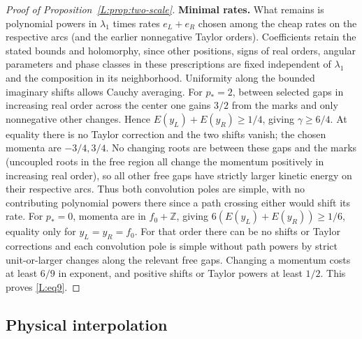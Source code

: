 \documentclass[11pt]{article}
\numberwithin{equation}{section}
\theoremstyle{definition}\newtheorem{definition}[theorem]{Definition}
\theoremstyle{remark}\newtheorem{remark}[theorem]{Remark}
\begin{document}
\begin{proof}[Proof of Proposition~\ref{L:prop:two-scale}]
\par  \textbf{Minimal rates.}
What remains is polynomial powers in \(\lambda_1\) times rates \(e_L+e_R\) chosen among the cheap rates on the respective arcs (and the earlier nonnegative Taylor orders). Coefficients retain the stated bounds and holomorphy, since other positions, signs of real orders, angular parameters and phase classes in these prescriptions are fixed independent of \(\lambda_1\) and the composition in its neighborhood. Uniformity along the bounded imaginary shifts allows Cauchy averaging. For \(p_*=2\), between selected gaps in increasing real order across the center one gains \(3/2\) from the marks and only nonnegative other changes. Hence \(E(y_L)+E(y_R)\ge1/4\), giving \(\gamma\ge6/4\). At equality there is no Taylor correction and the two shifts vanish; the chosen momenta are \(-3/4,3/4\). No changing roots are between these gaps and the marks (uncoupled roots in the free region all change the momentum positively in increasing real order), so all other free gaps have strictly larger kinetic energy on their respective arcs. Thus both convolution poles are simple, with no contributing polynomial powers there since a path crossing either would shift its rate. For \(p_*=0\), momenta are in \(f_0+\mathbb Z\), giving \(6(E(y_L)+E(y_R))\ge1/6\), equality only for \(y_L=y_R=f_0\). For that order there can be no shifts or Taylor corrections and each convolution pole is simple without path powers by strict unit-or-larger changes along the relevant free gaps. Changing a momentum costs at least \(6/9\) in exponent, and positive shifts or Taylor powers at least \(1/2\). This proves \eqref{L:eq9}.


\end{proof}

\subsection{Physical interpolation}\label{L:step16}
\end{document}
